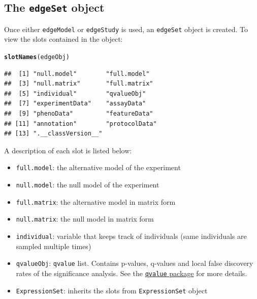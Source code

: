 \documentclass{article}\usepackage[]{graphicx}\usepackage[]{color}
\makeatletter
\newcommand{\hlstd}[1]{\textcolor[rgb]{0.345,0.345,0.345}{#1}}%
\newcommand{\hlkwd}[1]{\textcolor[rgb]{0.737,0.353,0.396}{\textbf{#1}}}%
\newenvironment{kframe}{%
 \def\at@end@of@kframe{}%
 \ifinner\ifhmode%
  \def\at@end@of@kframe{\end{minipage}}%
  \begin{minipage}{\columnwidth}%
 \fi\fi%
 \def\FrameCommand##1{\hskip\@totalleftmargin \hskip-\fboxsep
 \colorbox{shadecolor}{##1}\hskip-\fboxsep
     \hskip-\linewidth \hskip-\@totalleftmargin \hskip\columnwidth}%
 \MakeFramed {\advance\hsize-\width
   \@totalleftmargin\z@ \linewidth\hsize
   \@setminipage}}%
 {\par\unskip\endMakeFramed%
 \at@end@of@kframe}
\newenvironment{knitrout}{}{} %
\makeatother
\begin{document}
\subsection{The {\tt edgeSet} object}
\label{subsec:edgeSet}
Once either {\tt edgeModel} or {\tt edgeStudy} is used, an {\tt edgeSet} object is created. To view the slots contained in the object:
\begin{knitrout}
\color{fgcolor}\begin{kframe}
\begin{alltt}
\hlkwd{slotNames}\hlstd{(edgeObj)}
\end{alltt}
\begin{verbatim}
##  [1] "null.model"        "full.model"       
##  [3] "null.matrix"       "full.matrix"      
##  [5] "individual"        "qvalueObj"        
##  [7] "experimentData"    "assayData"        
##  [9] "phenoData"         "featureData"      
## [11] "annotation"        "protocolData"     
## [13] ".__classVersion__"
\end{verbatim}
\end{kframe}
\end{knitrout}
A description of each slot is listed below: 
\begin{itemize}
\item {\tt full.model}: the alternative model of the experiment
\item {\tt null.model}: the null model of the experiment
\item {\tt full.matrix}: the alternative model in matrix form
\item {\tt null.matrix}: the null model in matrix form
\item {\tt individual}: variable that keeps track of individuals (same individuals are sampled multiple times)
\item {\tt qvalueObj}: {\tt qvalue} list. Contains p-values, q-values and local false discovery rates of the significance analysis. See the \href{http://www.bioconductor.org/packages/release/bioc/html/qvalue.html}{{\tt qvalue} package} for more details.
\item {\tt ExpressionSet}: inherits the slots from {\tt ExpressionSet} object
\end{itemize}
\end{document}
